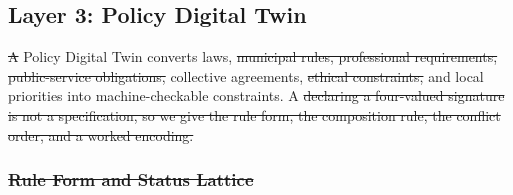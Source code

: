 \documentclass[utf8]{FrontiersinHarvard}
\providecommand{\DIFadd}[1]{{\protect\color{blue}\uwave{#1}}} %
\providecommand{\DIFdel}[1]{{\protect\color{red}\sout{#1}}}                      %
\providecommand{\DIFaddbegin}{} %
\providecommand{\DIFaddend}{} %
\providecommand{\DIFdelbegin}{} %
\providecommand{\DIFdelend}{} %
\begin{document}
	\subsection{Layer 3: Policy Digital Twin}
	\label{sec:policytwin}

	\DIFdelbegin \DIFdel{A }\DIFdelend \DIFaddbegin \DIFadd{The }\DIFaddend Policy Digital Twin converts laws, \DIFdelbegin \DIFdel{municipal rules, professional requirements, public-service obligations, }\DIFdelend \DIFaddbegin \DIFadd{rules, }\DIFaddend collective agreements, \DIFdelbegin \DIFdel{ethical constraints, }\DIFdelend and local priorities into machine-checkable constraints. A \DIFdelbegin \DIFdel{declaring a four-valued signature is not a specification, so we give the rule form, the composition rule, the conflict order, and a worked encoding.
	}%

\subsubsection*{\DIFdel{Rule Form and Status Lattice}}
\end{document}
